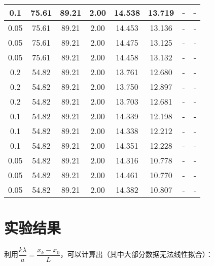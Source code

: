 \documentclass[a4paper]{ltxdoc}
\begin{document}
\begin{tabular}{|c|c|c|c|c|c|c|c|}
    \hline 0.1      & 75.61            & 89.21                & 2.00                 & 14.538   & 13.719 & -      & -      \\
    \hline 0.05     & 75.61            & 89.21                & 2.00                 & 14.453   & 13.136 & -      & -      \\
    \hline 0.05     & 75.61            & 89.21                & 2.00                 & 14.475   & 13.125 & -      & -      \\
    \hline 0.05     & 75.61            & 89.21                & 2.00                 & 14.458   & 13.132 & -      & -      \\\hline
    \hline 0.2      & 54.82            & 89.21                & 2.00                 & 13.761   & 12.680 & -      & -      \\
    \hline 0.2      & 54.82            & 89.21                & 2.00                 & 13.750   & 12.897 & -      & -      \\
    \hline 0.2      & 54.82            & 89.21                & 2.00                 & 13.703   & 12.681 & -      & -      \\
    \hline 0.1      & 54.82            & 89.21                & 2.00                 & 14.339   & 12.198 & -      & -      \\
    \hline 0.1      & 54.82            & 89.21                & 2.00                 & 14.338   & 12.212 & -      & -      \\
    \hline 0.1      & 54.82            & 89.21                & 2.00                 & 14.351   & 12.228 & -      & -      \\
    \hline 0.05     & 54.82            & 89.21                & 2.00                 & 14.316   & 10.778 & -      & -      \\
    \hline 0.05     & 54.82            & 89.21                & 2.00                 & 14.461   & 10.770 & -      & -      \\
    \hline 0.05     & 54.82            & 89.21                & 2.00                 & 14.382   & 10.807 & -      & -      \\\hline
\end{tabular}
\section{实验结果}
利用$\dfrac{k\lambda}{a} = \dfrac{x_k -x_0}{L}$，可以计算出（其中大部分数据无法线性拟合）：
\bigskip
\end{document}
